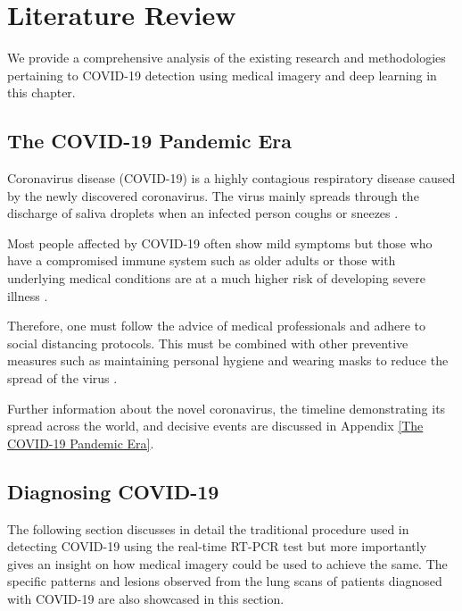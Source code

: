 
\chapter{Literature Review} %

\label{LR} %


We provide a comprehensive analysis of the existing research and methodologies 
pertaining to COVID-19 detection using 
medical imagery and deep learning in this chapter.


\section{The COVID-19 Pandemic Era}

Coronavirus disease (COVID-19) is a highly contagious respiratory disease caused by the newly discovered coronavirus. 
The virus mainly spreads through the discharge of saliva droplets when an infected person coughs or sneezes \cite{WHO2020}.

Most people affected by COVID-19 often show mild symptoms but those who have a compromised immune system such as older adults or those with underlying medical conditions are at a much higher risk of developing severe illness \cite{CDC2020}.

Therefore, one must follow the advice of medical professionals and adhere to social distancing protocols. This must be combined with other preventive measures such as maintaining personal hygiene and wearing masks to reduce the spread of the virus \cite{CDCa2020}.

Further information about the novel coronavirus, the timeline demonstrating its spread across the world, and decisive events are discussed in Appendix \ref{The COVID-19 Pandemic Era}.

\section{Diagnosing COVID-19}
The following section discusses in detail the traditional procedure used 
in detecting COVID-19 using the real-time RT-PCR test but more importantly gives an insight on 
how medical imagery could be used to achieve the same. The specific patterns 
and lesions observed from the lung scans of patients diagnosed with COVID-19 are also showcased in this section.

